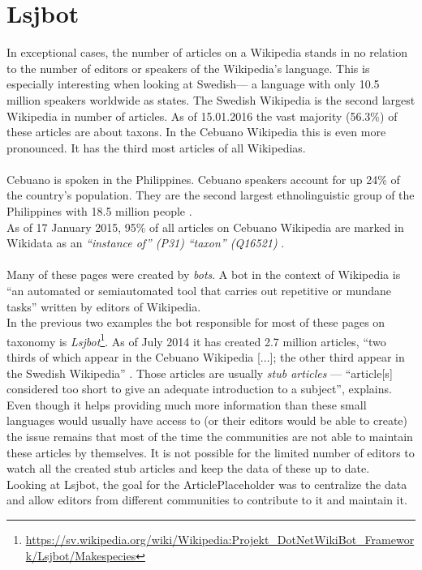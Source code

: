 \section{Lsjbot}
In exceptional cases, the number of articles on a Wikipedia stands in no relation to the number of editors or speakers of the Wikipedia's language. This is especially interesting when looking at Swedish--- a language with only 10.5 million speakers worldwide as \citet{nlpd:01} states. The Swedish Wikipedia is the second largest Wikipedia in number of articles. As of 15.01.2016 the vast majority (56.3\%) of these articles are about taxons.
In the Cebuano Wikipedia this is even more pronounced. It has the third most articles of all Wikipedias. \citep{wiki:07} \\
\\
Cebuano is spoken in the Philippines. Cebuano speakers account for up 24\% of the country's population. \citep{cebuano:01} They are the second largest ethnolinguistic group of the Philippines with 18.5 million people \citep{cebuano:02}. \\
As of 17 January 2015, 95\% of all articles on Cebuano Wikipedia are marked in Wikidata as an \textit{``instance of'' (P31)} \textit{``taxon'' (Q16521)} \citep{wiki:07}. \\
\\
Many of these pages were created by \textit{bots}. A bot in the context of Wikipedia is ``an automated or semiautomated tool that carries out repetitive or mundane tasks'' \citep{wiki:08} written by editors of Wikipedia. \\
In the previous two examples the bot responsible for most of these pages on taxonomy is \textit{Lsjbot}\footnote{\url{https://sv.wikipedia.org/wiki/Wikipedia:Projekt_DotNetWikiBot_Framework/Lsjbot/Makespecies}}. As of July 2014 it has created 2.7 million articles, ``two thirds of which appear in the Cebuano Wikipedia [...]; the other third appear in the Swedish Wikipedia'' \citep{wiki:09}. Those articles are usually \textit{stub articles} --- ``article[s] considered too short to give an adequate introduction to a subject'', \citet{stubs} explains. \\
Even though it helps providing much more information than these small languages would usually have access to (or their editors would be able to create) the issue remains that most of the time the communities are not able to maintain these articles by themselves. It is not possible for the limited number of editors to watch all the created stub articles and keep the data of these up to date. \\
Looking at Lsjbot, the goal for the ArticlePlaceholder was to centralize the data and allow editors from different communities to contribute to it and maintain it.

